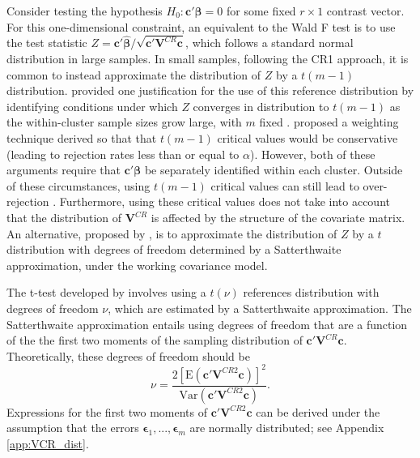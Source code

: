 \documentclass[12pt]{article}\usepackage[]{graphicx}\usepackage[]{color}
\newcommand{\E}{\text{E}}
\newcommand{\Var}{\text{Var}}
\newcommand{\bm}{\mathbf}
\newcommand{\bs}{\boldsymbol}
\begin{document}
Consider testing the hypothesis $H_0: \bm{c}'\bs\beta = 0$ for some fixed $r \times 1$ contrast vector. 
For this one-dimensional constraint, an equivalent to the Wald F test is to use the test statistic $Z = \bm{c}'\bs{\hat\beta} / \sqrt{\bm{c}'\bm{V}^{CR}\bm{c}}$, which follows a standard normal distribution in large samples. 
In small samples, following the CR1 approach, it is common to instead approximate the distribution of $Z$ by a $t(m - 1)$ distribution. 
\citet{Hansen2007asymptotic} provided one justification for the use of this reference distribution by identifying conditions under which $Z$ converges in distribution to $t(m-1)$ as the within-cluster sample sizes grow large, with $m$ fixed \citep[see also][]{Donald2007inference}. 
\citet{Ibragimov2010tstatistic} proposed a weighting technique derived so that that $t(m-1)$ critical values would be conservative (leading to rejection rates less than or equal to $\alpha$).
However, both of these arguments require that $\bm{c}'\bs\beta$ be separately identified within each cluster. 
Outside of these circumstances, using $t(m-1)$ critical values can still lead to over-rejection \citep{Cameron2015practitioners}. 
Furthermore, using these critical values does not take into account that the distribution of $\bm{V}^{CR}$ is affected by the structure of the covariate matrix. 
An alternative, proposed by \citet{Bell2002bias}, is to approximate the distribution of $Z$ by a $t$ distribution with degrees of freedom determined by a Satterthwaite approximation, under the working covariance model.

The t-test developed by \citet{Bell2002bias} involves using a $t(\nu)$ references distribution with degrees of freedom $\nu$, which are estimated by a Satterthwaite approximation.
The Satterthwaite approximation \citep{Satterthwaite1946approximate} entails using degrees of freedom that are a function of the the first two moments of the sampling distribution of $\bm{c}' \bm{V}^{CR} \bm{c}$.
Theoretically, these degrees of freedom should be 
\begin{equation}
\label{eq:nu_Satterthwaite}
\nu = \frac{2\left[\E\left(\bm{c}'\bm{V}^{CR2}\bm{c}\right)\right]^2}{\Var\left(\bm{c}'\bm{V}^{CR2}\bm{c}\right)}.
\end{equation}
Expressions for the first two moments of $\bm{c}'\bm{V}^{CR2}\bm{c}$ can be derived under the assumption that the errors $\bs\epsilon_1,...,\bs\epsilon_m$ are normally distributed; see Appendix \ref{app:VCR_dist}. 
\end{document}
